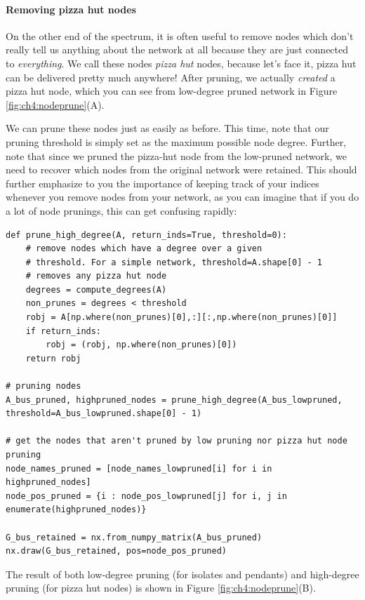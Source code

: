 \paragraph{Removing pizza hut nodes}

On the other end of the spectrum, it is often useful to remove nodes which don't really tell us anything about the network at all because they are just connected to \emph{everything}. We call these nodes \emph{pizza hut} nodes, because let's face it, pizza hut can be delivered pretty much anywhere! After pruning, we actually \emph{created} a pizza hut node, which you can see from low-degree pruned network in Figure \ref{fig:ch4:nodeprune}(A). 

We can prune these nodes just as easily as before. This time, note that our pruning threshold is simply set as the maximum possible node degree. Further, note that since we pruned the pizza-hut node from the low-pruned network, we need to recover which nodes from the original network were retained. This should further emphasize to you the importance of keeping track of your indices whenever you remove nodes from your network, as you can imagine that if you do a lot of node prunings, this can get confusing rapidly:

\begin{lstlisting}[style=python]
def prune_high_degree(A, return_inds=True, threshold=0):
    # remove nodes which have a degree over a given
    # threshold. For a simple network, threshold=A.shape[0] - 1
    # removes any pizza hut node
    degrees = compute_degrees(A)
    non_prunes = degrees < threshold
    robj = A[np.where(non_prunes)[0],:][:,np.where(non_prunes)[0]]
    if return_inds:
        robj = (robj, np.where(non_prunes)[0])
    return robj

# pruning nodes 
A_bus_pruned, highpruned_nodes = prune_high_degree(A_bus_lowpruned, threshold=A_bus_lowpruned.shape[0] - 1)

# get the nodes that aren't pruned by low pruning nor pizza hut node pruning
node_names_pruned = [node_names_lowpruned[i] for i in highpruned_nodes]
node_pos_pruned = {i : node_pos_lowpruned[j] for i, j in enumerate(highpruned_nodes)}

G_bus_retained = nx.from_numpy_matrix(A_bus_pruned)
nx.draw(G_bus_retained, pos=node_pos_pruned)
\end{lstlisting}
The result of both low-degree pruning (for isolates and pendants) and high-degree pruning (for pizza hut nodes) is shown in Figure \ref{fig:ch4:nodeprune}(B). 

